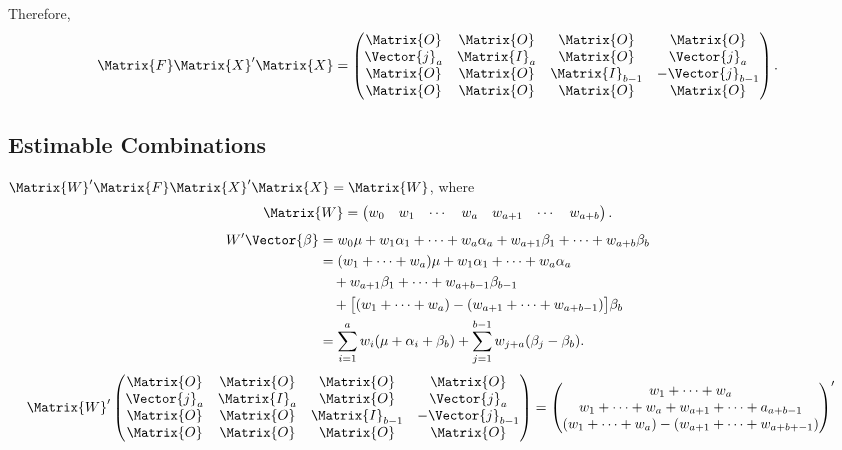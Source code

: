 Therefore,
\[ \Matrix{F}\Matrix{X}'\Matrix{X}
    =\begin{pmatrix}
        \Matrix{O}   & \Matrix{O}   & \Matrix{O}       & \Matrix{O}        \\
        \Vector{j}_a & \Matrix{I}_a & \Matrix{O}       & \Vector{j}_a      \\
        \Matrix{O}   & \Matrix{O}   & \Matrix{I}_{b-1} & -\Vector{j}_{b-1} \\
        \Matrix{O}   & \Matrix{O}   & \Matrix{O}       & \Matrix{O}
    \end{pmatrix}. \]
\subsection*{Estimable Combinations}
$ \Matrix{W}'\Matrix{F}\Matrix{X}'\Matrix{X}=\Matrix{W} $,
where
\[ \Matrix{W}=\begin{pmatrix}
        w_0 & w_1 & \cdots & w_a & w_{a+1} & \cdots & w_{a+b}
    \end{pmatrix}. \]
\begin{align*}
    W'\Vector{\beta}
     & =w_0\mu+w_1\alpha_1+\cdots+w_a\alpha_a+w_{a+1}\beta_1+\cdots+w_{a+b}\beta_b        \\
     & =(w_1+\cdots+w_a)\mu+w_1\alpha_1+\cdots+w_a\alpha_a                                \\
     & \quad+ w_{a+1}\beta_1+\cdots+w_{a+b-1}\beta_{b-1}                                  \\
     & \quad+\bigl[(w_1+\cdots+w_a)-(w_{a+1}+\cdots+w_{a+b-1})\bigr]\beta_b               \\
     & =\sum_{i=1}^{a}w_i(\mu+\alpha_i+\beta_b)+\sum_{j=1}^{b-1}w_{j+a}(\beta_j-\beta_b).
\end{align*}
\begin{align*}
    \Matrix{W}'\begin{pmatrix}
                   \Matrix{O}   & \Matrix{O}   & \Matrix{O}       & \Matrix{O}        \\
                   \Vector{j}_a & \Matrix{I}_a & \Matrix{O}       & \Vector{j}_a      \\
                   \Matrix{O}   & \Matrix{O}   & \Matrix{I}_{b-1} & -\Vector{j}_{b-1} \\
                   \Matrix{O}   & \Matrix{O}   & \Matrix{O}       & \Matrix{O}
               \end{pmatrix}
     & =\begin{pmatrix}
            w_1+\cdots+w_a                          \\
            w_1+\cdots+w_a+w_{a+1}+\cdots+a_{a+b-1} \\
            (w_1+\cdots+w_a)-(w_{a+1}+\cdots+w_{a+b+-1})
        \end{pmatrix}'
\end{align*}
